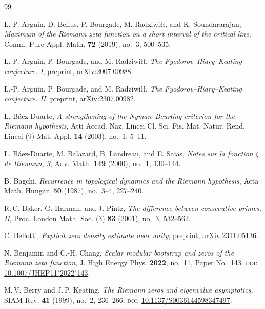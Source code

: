 \documentclass[11pt]{amsart}
\theoremstyle{definition}
\theoremstyle{remark}
\begin{document}

\begin{thebibliography}{99}

L.-P. Arguin, D. Belius, P. Bourgade, M. Radziwi\l\l{}, and K. Soundararajan,
\textit{Maximum of the Riemann zeta function on a short interval of the critical line},
Comm. Pure Appl. Math. \textbf{72} (2019), no.~3, 500--535.

L.-P. Arguin, P. Bourgade, and M. Radziwi\l\l{},
\textit{The Fyodorov--Hiary--Keating conjecture. I},
preprint, arXiv:2007.00988.

L.-P. Arguin, P. Bourgade, and M. Radziwi\l\l{},
\textit{The Fyodorov--Hiary--Keating conjecture. II},
preprint, arXiv:2307.00982.

L. B\'aez-Duarte,
\textit{A strengthening of the Nyman--Beurling criterion for the Riemann hypothesis},
Atti Accad. Naz. Lincei Cl. Sci. Fis. Mat. Natur. Rend. Lincei (9) Mat. Appl. \textbf{14} (2003), no.~1, 5--11.

L. B\'aez-Duarte, M. Balazard, B. Landreau, and E. Saias,
\textit{Notes sur la fonction $\zeta$ de Riemann, 3},
Adv. Math. \textbf{149} (2000), no.~1, 130--144.

B. Bagchi,
\textit{Recurrence in topological dynamics and the Riemann hypothesis},
Acta Math. Hungar. \textbf{50} (1987), no.~3--4, 227--240.

R.\,C. Baker, G. Harman, and J. Pintz,
\textit{The difference between consecutive primes. II},
Proc. London Math. Soc. (3) \textbf{83} (2001), no.~3, 532--562.

C. Bellotti,
\textit{Explicit zero density estimate near unity},
preprint, arXiv:2311.05136.

N. Benjamin and C.-H. Chang,
\textit{Scalar modular bootstrap and zeros of the Riemann zeta function},
J. High Energy Phys. \textbf{2022}, no.~11, Paper No.~143.
\textsc{doi:} \href{https://doi.org/10.1007/JHEP11(2022)143}{10.1007/JHEP11(2022)143}.

M.\,V. Berry and J.\,P. Keating,
\textit{The Riemann zeros and eigenvalue asymptotics},
SIAM Rev. \textbf{41} (1999), no.~2, 236--266.
\textsc{doi:} \href{https://doi.org/10.1137/S0036144598347497}{10.1137/S0036144598347497}.


\end{thebibliography}
\end{document}
